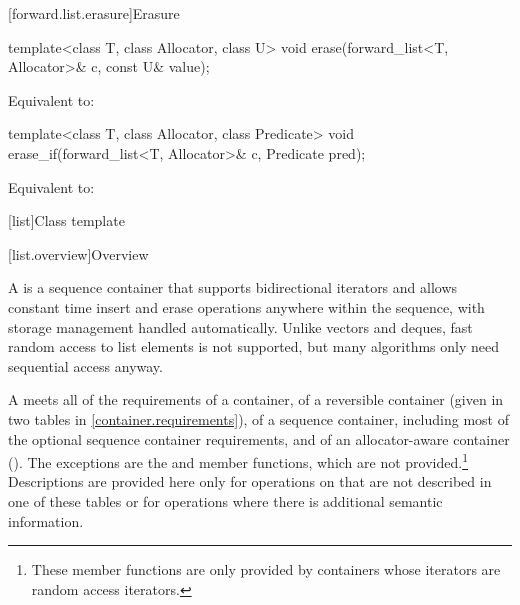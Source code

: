 [forward.list.erasure]{Erasure}

%
\begin{itemdecl}
template<class T, class Allocator, class U>
  void erase(forward_list<T, Allocator>& c, const U& value);
\end{itemdecl}

\begin{itemdescr}
\pnum
\effects
Equivalent to: 
\end{itemdescr}

%
\begin{itemdecl}
template<class T, class Allocator, class Predicate>
  void erase_if(forward_list<T, Allocator>& c, Predicate pred);
\end{itemdecl}

\begin{itemdescr}
\pnum
\effects
Equivalent to: 
\end{itemdescr}

[list]{Class template }

[list.overview]{Overview}

\pnum
{}%
A
is a sequence container that supports
bidirectional iterators and allows constant time insert and erase
operations anywhere within the sequence, with storage management handled
automatically. Unlike vectors and deques,
fast random access to list elements is not supported, but many
algorithms only need sequential access anyway.

\pnum
A  meets all of the requirements of a container, of
a reversible container (given in two tables in
\ref{container.requirements}), of a sequence container,
including most of the optional sequence container
requirements, and of an allocator-aware container
().
The exceptions are the
and
member functions, which are not provided.\footnote{These member functions
are only provided by containers whose iterators
are random access iterators.
}
Descriptions are provided here only for operations on
that are not described in one of these tables
or for operations where there is additional semantic information.

